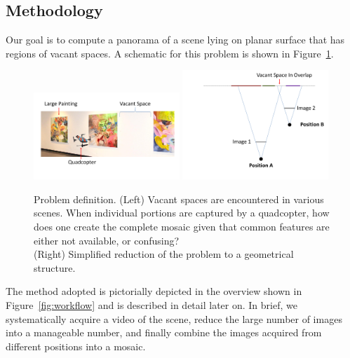 \documentclass[11pt]{article}
\begin{document}
\subsection{Methodology}
Our goal is to compute a panorama of a scene lying on
planar surface that has regions of vacant spaces.  A schematic for
this problem is shown in Figure~\ref{fig:schematic}.

\begin{figure}[h!]
  \centering
  \includegraphics[width=0.49\textwidth]{mosaicing/figures/indoor}
  \includegraphics[width=0.49\textwidth]{mosaicing/figures/stereoOverlap}

  \caption{ \label{fig:schematic} Problem definition. (Left) Vacant spaces
    are encountered in various scenes.  When individual portions are
    captured by a quadcopter, how does one create the complete mosaic
    given that common features are either not available, or
    confusing?\\
    (Right) Simplified reduction of the problem to a geometrical structure.
  }
\end{figure}    

The method adopted is pictorially depicted in the overview shown in
Figure~\ref{fig:workflow} and is described in detail later on.  In
brief, we systematically acquire a video of the scene, reduce the large
number of images into a manageable number, and finally combine the
images acquired from different positions into a mosaic.
\end{document}
